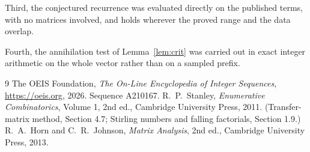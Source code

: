 \documentclass[11pt,a4paper]{article}
\theoremstyle{plain}
\theoremstyle{definition}
\begin{document}
Third, the conjectured recurrence was evaluated directly on the published terms, with no
matrices involved, and holds wherever the proved range and the data overlap.

Fourth, the annihilation test of Lemma~\ref{lem:crit} was carried out in exact integer
arithmetic on the whole vector rather than on a sampled prefix.

\begin{thebibliography}{9}
 The OEIS Foundation, \emph{The On-Line Encyclopedia of Integer
Sequences}, \url{https://oeis.org}, 2026. Sequence A210167.
 R.~P.~Stanley, \emph{Enumerative Combinatorics}, Volume 1, 2nd ed.,
Cambridge University Press, 2011. (Transfer-matrix method, Section 4.7; Stirling numbers and
falling factorials, Section 1.9.)
 R.~A.~Horn and C.~R.~Johnson, \emph{Matrix Analysis}, 2nd ed., Cambridge
University Press, 2013.
\end{thebibliography}
\end{document}

